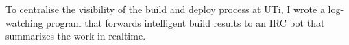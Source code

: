 {
  To centralise the visibility of the build and deploy process at UTi, I wrote a log-watching program that forwards intelligent build results to an IRC bot that summarizes the work in realtime.
}
